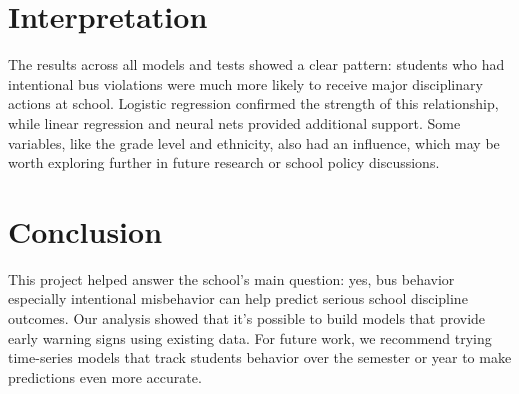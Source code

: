 \documentclass[letterpaper]{article}
\begin{document}
\section*{Interpretation}

The results across all models and tests showed a clear pattern: 
students who had intentional bus violations were much more likely 
to receive major disciplinary actions at school. Logistic regression 
confirmed the strength of this relationship, while linear regression 
and neural nets provided additional support. Some variables, like the 
grade level and ethnicity, also had an influence, which may be worth 
exploring further in future research or school policy discussions.

\section*{Conclusion}

This project helped answer the school's main question: yes, bus 
behavior especially intentional misbehavior can help predict serious 
school discipline outcomes. Our analysis showed that it's possible to 
build models that provide early warning signs using existing data. For 
future work, we recommend trying time-series models that track 
students behavior over the semester or year to make predictions 
even more accurate.
\end{document}
